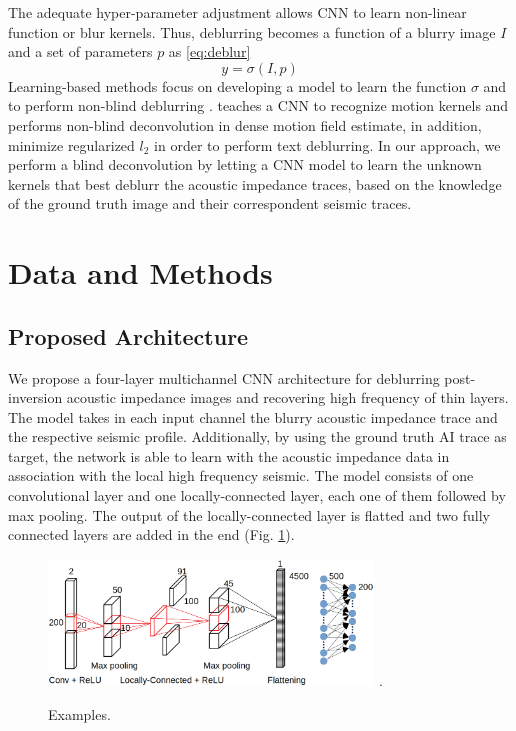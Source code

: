 \documentclass[journal]{IEEEtran}
\begin{document}
The adequate hyper-parameter adjustment allows CNN to learn non-linear
function or blur kernels. Thus, deblurring becomes a function of
a blurry image $I$ and a set of parameters $p$ as \ref{eq:deblur}
\begin{equation}
 y = \sigma(I,p)
 \label{eq:deblur}
\end{equation}
Learning-based methods focus on developing a model to learn the function
$\sigma$ and to perform non-blind deblurring \cite{Chakrabarti2016}.
\cite{Sun2015} teaches a CNN to recognize motion kernels and performs non-blind
deconvolution in dense motion field estimate, in addition, \cite{Hradis2015}
minimize regularized $l_2$ in order to perform text deblurring.
In our approach, we perform a blind deconvolution by letting a CNN model
to learn the unknown kernels that best deblurr the acoustic impedance
traces, based on the knowledge of the ground truth image and their
correspondent seismic traces.

\section{Data and Methods}\label{Method}

\subsection{Proposed Architecture}

We propose a four-layer multichannel CNN architecture for deblurring
post-inversion acoustic impedance images and recovering high
frequency of thin layers. The model takes in each input channel the
blurry acoustic impedance trace and the respective seismic
profile. Additionally, by using the ground truth AI trace as
target, the network is able to learn with the acoustic
impedance data in association with the local high frequency seismic.
The model consists of one convolutional layer and one locally-connected
layer, each one of them followed by max pooling. The output of the
locally-connected layer is flatted and two fully connected layers are
added in the end (Fig. \ref{fig_model}).
\begin{figure}[!t]
\centering
\includegraphics[width=3.4in]{Figs/model}
\DeclareGraphicsExtensions.
\caption{Examples.}
\label{fig_model}
\end{figure}
\end{document}
